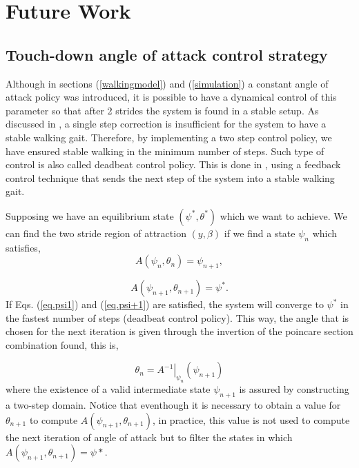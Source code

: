 \section{Future Work}
\subsection{Touch-down angle of attack control strategy}\label{TDcontrol}
Although in sections (\ref{walkingmodel}) and (\ref{simulation}) a constant angle of attack policy was introduced, it is possible to have a dynamical control of this parameter so that after 2 strides the system is found in a stable setup.  As discussed in \cite{Carver2009}, a single step correction is insufficient for the system to have a stable walking gait. Therefore, by implementing a two step control policy, we have ensured stable walking in the minimum number of steps. Such type of control is also called deadbeat control policy. This is done in \cite{Vejdani2015}, using a feedback control technique that sends the next step of the system into a stable walking gait.

\par Supposing we have an equilibrium state $(\psi^*,\theta^*)$ which we want to achieve. We can find the two stride region of attraction $(y,\beta)$ if we find a state $\psi_n$ which satisfies,
\begin{equation}
  A(\psi_n,\theta_n)=\psi_{n+1},
  \label{eq.psi1}
  \end{equation}

\begin{equation}
  A(\psi_{n+1},\theta_{n+1})=\psi^*.
  \label{eq.psi+1}
\end{equation}
\noindent If Eqs. (\ref{eq.psi1}) and (\ref{eq.psi+1}) are satisfied, the system will converge to $\psi^*$ in the fastest number of steps (deadbeat control policy). This way, the angle that is chosen for the next iteration is given through the invertion of the poincare section combination found, this is, 

\begin{equation}
  \theta_n=\left.A^{-1}\right|_{\psi_n}(\psi_{n+1})
\end{equation}
where the existence of a valid intermediate state $\psi_{n+1}$ is assured by constructing a two-step domain. Notice that eventhough it is necessary to obtain a value for $\theta_{n+1}$ to compute $A(\psi_{n+1},\theta_{n+1})$, in practice, this value is not used to compute the next iteration of angle of attack but to filter the states in which $A(\psi_{n+1},\theta_{n+1})=\psi*$.



